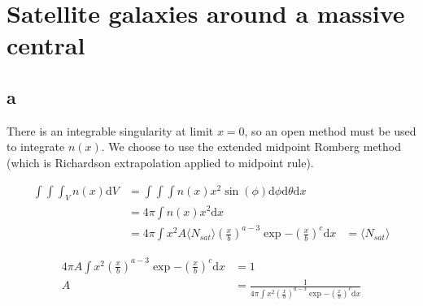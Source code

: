 \section{Satellite galaxies around a massive central}

\subsection{a}

There is an integrable singularity at limit $x=0$, so an open method must be used to integrate $n(x)$.
We choose to use the extended midpoint Romberg method (which is Richardson extrapolation applied to midpoint rule).





\begin{align*}
    \int\int\int_V n(x)\text{d}V &= \int\int\int n(x)x^2\sin(\phi)\text{d}\phi\text{d}\theta\text{d}x\\
    &=4\pi \int n(x)x^2\text{d}x\\
    &=4\pi \int x^2A\langle N_{sat}\rangle(\frac{x}{b})^{a-3}\exp{-(\frac{x}{b})^c}\text{d}x
    &=\langle N_{sat}\rangle
\end{align*}

\begin{align*}
    4\pi A\int x^2(\frac{x}{b})^{a-3}\exp{-(\frac{x}{b})^c}\text{d}x &= 1\\
    A&=\frac{1}{4\pi \int x^2(\frac{x}{b})^{a-3}\exp{-(\frac{x}{b})^c}\text{d}x}
\end{align*}
